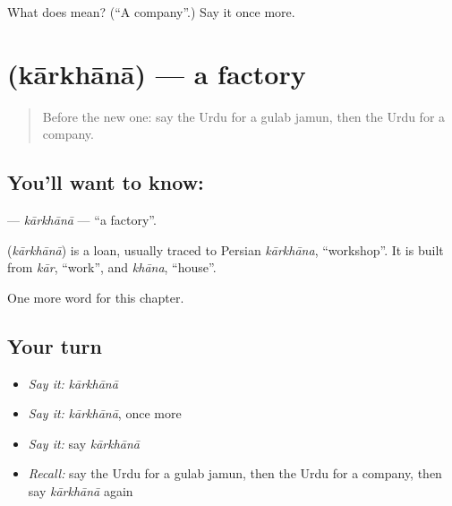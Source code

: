 \begin{tcolorbox}[breakable,colback=teal!4,colframe=teal!35!black,title={Before you move on}]
What does  mean? (\textquotedblleft{}A company\textquotedblright{}.) Say it once more.
\end{tcolorbox}
\section[\texorpdfstring{\ur{کارخانہ} (kārkhānā)}{کارخانہ (kārkhānā)}]{ (kārkhānā) — a factory}

\label{lesson:UR-C261-karkhana}



\begin{quote}
Before the new one: say the Urdu for a gulab jamun, then the Urdu for a company.
\end{quote}

\subsection*{You'll want to know: }
\textbf{} — \emph{kārkhānā} — \textquotedblleft{}a factory\textquotedblright{}.

\begin{cousinweb}
\textbf{} (\emph{kārkhānā}) is a loan, usually traced to Persian \emph{kārkhāna}, \textquotedblleft{}workshop\textquotedblright{}. It is built from \emph{kār}, \textquotedblleft{}work\textquotedblright{}, and \emph{khāna}, \textquotedblleft{}house\textquotedblright{}.
\end{cousinweb}

\begin{grammarlens}[title={What you've built}]
One more word for this chapter.
\end{grammarlens}

\subsection*{Your turn}
\begin{itemize}
\raggedright
  \item \emph{Say it:} \emph{kārkhānā}
  \item \emph{Say it:} \emph{kārkhānā}, once more
  \item \emph{Say it:} say \emph{kārkhānā}
  \item \emph{Recall:} say the Urdu for a gulab jamun, then the Urdu for a company, then say \emph{kārkhānā} again
\end{itemize}

